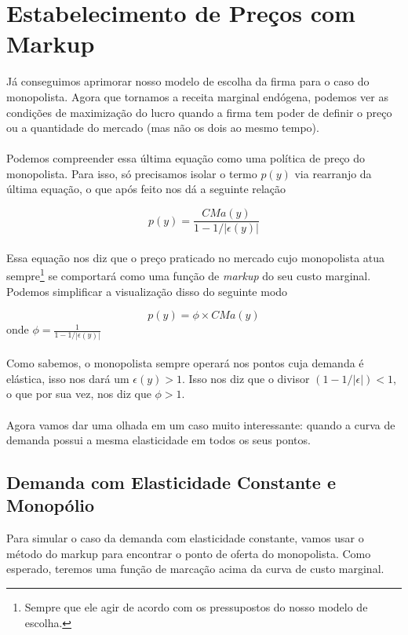 \documentclass[a4paper,11pt,oneside]{book}
\theoremstyle{definition}
\theoremstyle{break}
\begin{document}
\section{Estabelecimento de Preços com Markup}

Já conseguimos aprimorar nosso modelo de escolha da firma para o caso do monopolista. Agora que tornamos a receita marginal endógena, podemos ver as condições de maximização do lucro quando a firma tem poder de definir o preço ou a quantidade do mercado (mas não os dois ao mesmo tempo).
\\
\\
Podemos compreender essa última equação como uma política de preço do monopolista. Para isso, só precisamos isolar o termo $p(y)$ via rearranjo da última equação, o que após feito nos dá a seguinte relação

$$ p(y) = \frac{CMa(y)}{1 - 1/|\epsilon(y)|} $$
\\
Essa equação nos diz que o preço praticado no mercado cujo monopolista atua sempre\footnote{Sempre que ele agir de acordo com os pressupostos do nosso modelo de escolha.} se comportará como uma função de \textit{markup} do seu custo marginal. Podemos simplificar a visualização disso do seguinte modo

$$ p(y) = \phi \times CMa(y) $$
onde $\phi = \frac{1}{1 - 1/|\epsilon(y)|}$
\\
\\
Como sabemos, o monopolista sempre operará nos pontos cuja demanda é elástica, isso nos dará um $\epsilon(y) > 1$. Isso nos diz que o divisor $(1 - 1/|\epsilon|) <  1$, o que por sua vez, nos diz que $\phi > 1$.
\\
\\
Agora vamos dar uma olhada em um caso muito interessante: quando a curva de demanda possui a mesma elasticidade em todos os seus pontos.

\subsection{Demanda com Elasticidade Constante e Monopólio}

Para simular o caso da demanda com elasticidade constante, vamos usar o método do markup para encontrar o ponto de oferta do monopolista. Como esperado, teremos uma função de marcação acima da curva de custo marginal.
\end{document}
